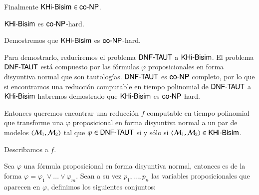 \begin{demostracion}
    


    Finalmente $\rm\textsf{KHi-Bisim} \in \rm\textsf{co-NP}$.

\end{demostracion}

\begin{lema}
    $\rm\textsf{KHi-Bisim}$ es $\rm\textsf{co-NP}$-hard.
\end{lema}

\begin{demostracion}

    Demostremos que $\rm\textsf{KHi-Bisim}$ es $\rm\textsf{co-NP}$-hard.

    Para demostrarlo, reduciremos el problema $\rm\textsf{DNF-TAUT}$ a $\rm\textsf{KHi-Bisim}$. El problema $\rm\textsf{DNF-TAUT}$ está compuesto 
    por las fórmulas $\varphi$ proposicionales en forma disyuntiva normal que son tautologías. 
    $\rm\textsf{DNF-TAUT}$ es $\rm\textsf{co-NP}$ completo, por lo que si encontramos una reducción computable en tiempo polinomial de 
    $\rm\textsf{DNF-TAUT}$ a $\rm\textsf{KHi-Bisim}$ habremos demostrado que $\rm\textsf{KHi-Bisim}$ es $\rm\textsf{co-NP}$-hard.

    Entonces queremos encontrar una reducción $f$ computable en tiempo polinomial que transforme una $\varphi$ proposicional 
    en forma disyuntiva normal a un par de modelos $\langle \mathcal{M}_1,\mathcal{M}_2 \rangle$ tal que $\varphi \in \rm\textsf{DNF-TAUT}$ si y sólo si 
    $\langle \mathcal{M}_1,\mathcal{M}_2 \rangle \in \rm\textsf{KHi-Bisim}$.

    Describamos a $f$.

    Sea $\varphi$ una fórmula proposicional en forma disyuntiva normal, entonces es de la forma 
    $\varphi = \varphi_1 \vee ... \vee \varphi_m$. Sean a su vez $p_1,...,p_n$ las variables proposicionales que aparecen en $\varphi$, 
    definimos los siguientes conjuntos:


\end{demostracion}
